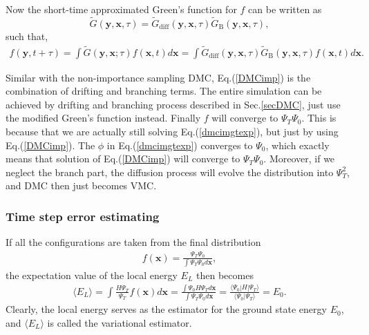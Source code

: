 \documentclass[12pt,letterpaper,UTF8]{report}
\begin{document}
{Now the short-time approximated Green's function for $f$ can be written as
\begin{equation}
\tilde{G}(\bm{y},\bm{x},\tau) = \tilde{G}_{\textrm{diff}}(\bm{y},\bm{x},\tau)  \tilde{G}_{\textrm{B}}(\bm{y},\bm{x},\tau) ,
\end{equation}
such that,
\begin{eqnarray}
f(\bm{y},t+\tau) = \int \tilde{G}(\bm{y},\bm{x};\tau) f(\bm{x},t) d\bm{x} =
\int
 \tilde{G}_{\textrm{diff}}(\bm{y},\bm{x},\tau)  \tilde{G}_{\textrm{B}}(\bm{y},\bm{x},\tau)
f(\bm{x},t) d\bm{x}
\label{fGdiffGB}.
 \end{eqnarray}


Similar with the non-importance sampling DMC, Eq.(\ref{DMCimp}) is the combination of drifting and branching terms. The entire simulation can be achieved by drifting and branching process described in Sec.\ref{secDMC}, just use the modified Green's function instead. Finally $f$ will converge to $\Psi_T \Psi_0$. This is because that we are actually still solving Eq.(\ref{dmcimgtexp}), but just by using Eq.(\ref{DMCimp}). The $\phi$ in Eq.(\ref{dmcimgtexp}) converges to $\Psi_0$, which exactly means that solution of Eq.(\ref{DMCimp}) will converge to $\Psi_T \Psi_0$. Moreover, if we neglect the branch part, the diffusion process will evolve the distribution into $\Psi_T^2$, and DMC then just becomes VMC.















\subsubsection{Time step error estimating}

If all the configurations are taken from the final distribution
\begin{eqnarray}
f(\bm{x})=\frac{\Psi_T \Psi_0}{ { \int \Psi_T \Psi_0 d \bm{x}}},
 \end{eqnarray}
the expectation value of the local energy $E_L$ then becomes
\begin{eqnarray}
\langle E_L \rangle =  \int  \frac{H \Psi_T}{\Psi_T} f(\bm{x}) d\bm{x}
=\frac{ { \int   \Psi_0 H\Psi_T d\bm{x} } }{{ \int \Psi_T \Psi_0 d \bm{x}}}
=\frac{\langle \Psi_0 | H | \Psi_T \rangle}{\langle \Psi_0 | \Psi_T \rangle}
= E_0. \label{ELaveE0}
 \end{eqnarray}
Clearly, the local energy serves as the estimator for the ground state energy $E_0$,
and $\langle E_L \rangle$ is called the variational estimator.

}
\end{document}
